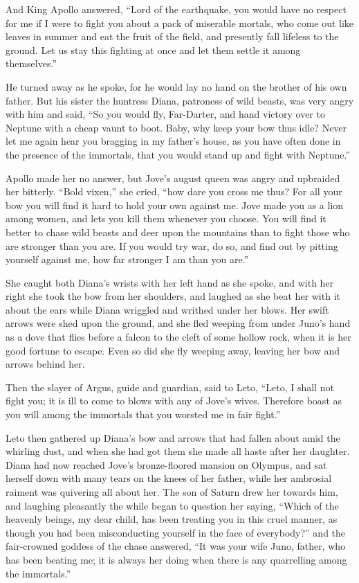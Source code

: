And King Apollo answered, “Lord of the earthquake, you would have no
respect for me if I were to fight you about a pack of miserable mortals,
who come out like leaves in summer and eat the fruit of the field, and
presently fall lifeless to the ground. Let us stay this fighting at once
and let them settle it among themselves.”

He turned away as he spoke, for he would lay no hand on the brother of his
own father. But his sister the huntress Diana, patroness of wild beasts,
was very angry with him and said, “So you would fly, Far-Darter, and hand
victory over to Neptune with a cheap vaunt to boot. Baby, why keep your
bow thus idle? Never let me again hear you bragging in my father’s house,
as you have often done in the presence of the immortals, that you would
stand up and fight with Neptune.”

Apollo made her no answer, but Jove’s august queen was angry and upbraided
her bitterly. “Bold vixen,” she cried, “how dare you cross me thus? For
all your bow you will find it hard to hold your own against me. Jove made
you as a lion among women, and lets you kill them whenever you choose. You
will find it better to chase wild beasts and deer upon the mountains than
to fight those who are stronger than you are. If you would try war, do so,
and find out by pitting yourself against me, how far stronger I am than
you are.”

She caught both Diana’s wrists with her left hand as she spoke, and with
her right she took the bow from her shoulders, and laughed as she beat her
with it about the ears while Diana wriggled and writhed under her blows.
Her swift arrows were shed upon the ground, and she fled weeping from
under Juno’s hand as a dove that flies before a falcon to the cleft of
some hollow rock, when it is her good fortune to escape. Even so did she
fly weeping away, leaving her bow and arrows behind her.

Then the slayer of Argus, guide and guardian, said to Leto, “Leto, I shall
not fight you; it is ill to come to blows with any of Jove’s wives.
Therefore boast as you will among the immortals that you worsted me in
fair fight.”

Leto then gathered up Diana’s bow and arrows that had fallen about amid
the whirling dust, and when she had got them she made all haste after her
daughter. Diana had now reached Jove’s bronze-floored mansion on Olympus,
and sat herself down with many tears on the knees of her father, while her
ambrosial raiment was quivering all about her. The son of Saturn drew her
towards him, and laughing pleasantly the while began to question her
saying, “Which of the heavenly beings, my dear child, has been treating
you in this cruel manner, as though you had been misconducting yourself in
the face of everybody?” and the fair-crowned goddess of the chase
answered, “It was your wife Juno, father, who has been beating me; it is
always her doing when there is any quarrelling among the immortals.”

